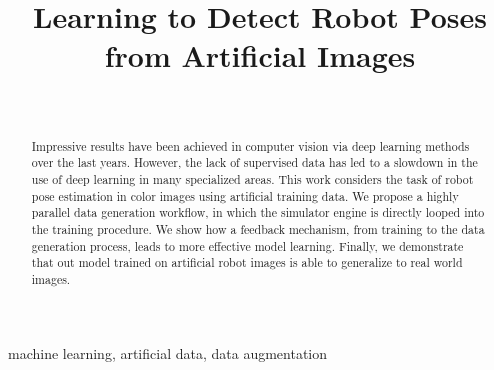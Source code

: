 \documentclass[conference]{IEEEtran}
\begin{document}
\title{Learning to Detect Robot Poses from Artificial Images\\
}

\author{
    \\
}


\maketitle

\begin{abstract}
    Impressive results have been achieved in computer vision via deep learning methods over the last years. However, the lack of supervised data has led to a slowdown in the use of deep learning in many specialized areas. This work considers the task of robot pose estimation in color images using artificial training data. We propose a highly parallel data generation workflow, in which the simulator engine is directly looped into the training procedure. We show how a feedback mechanism, from training to the data generation process, leads to more effective model learning. Finally, we demonstrate that out model trained on artificial robot images is able to generalize to real world images. 
\end{abstract}

\begin{IEEEkeywords}
machine learning, artificial data, data augmentation
\end{IEEEkeywords}
\end{document}

